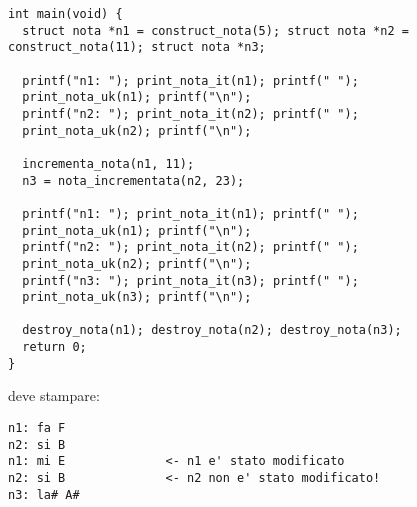 \documentclass{article}[10pt]
\newcounter{esnu}
\newenvironment{esercizio}{\medskip \noindent {\bf Esercizio\addtocounter{esnu}{1} \arabic{esnu}}}{}
\begin{document}
\begin{esercizio}
{\begin{verbatim}
int main(void) {
  struct nota *n1 = construct_nota(5); struct nota *n2 = construct_nota(11); struct nota *n3;

  printf("n1: "); print_nota_it(n1); printf(" ");
  print_nota_uk(n1); printf("\n");
  printf("n2: "); print_nota_it(n2); printf(" ");
  print_nota_uk(n2); printf("\n");

  incrementa_nota(n1, 11);
  n3 = nota_incrementata(n2, 23);

  printf("n1: "); print_nota_it(n1); printf(" ");
  print_nota_uk(n1); printf("\n");
  printf("n2: "); print_nota_it(n2); printf(" ");
  print_nota_uk(n2); printf("\n");
  printf("n3: "); print_nota_it(n3); printf(" ");
  print_nota_uk(n3); printf("\n");

  destroy_nota(n1); destroy_nota(n2); destroy_nota(n3);
  return 0;
}
\end{verbatim}}
\noindent
deve stampare:

{\small
\begin{verbatim}
n1: fa F
n2: si B
n1: mi E              <- n1 e' stato modificato
n2: si B              <- n2 non e' stato modificato!
n3: la# A#
\end{verbatim}
}

\end{esercizio}
%
\end{document}
